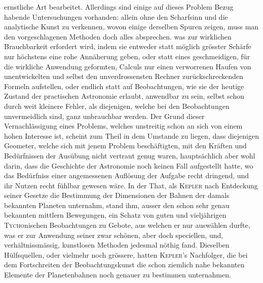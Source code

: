 \noindent ernstliche Art bearbeitet. Allerdings sind einige auf dieses Problem Bezug habende Untersuchungen vorhanden: allein ohne den Scharfsinn und die analytische Kunst zu verkennen, wovon einige derselben Spuren zeigen, muss man den vorgeschlagenen Methoden doch alles absprechen. was zur wirklichen Brauchbarkeit erfordert wird, indem sie entweder statt möglich grösster Schärfe nur höchstens eine rohe Annäherung geben, oder statt eines geschmeidigen, für die wirkliche Anwendung geformten, Calculs nur einen verworrenen Haufen von unentwickelten und selbst den unverdrossensten Rechner zurückschreckenden Formeln aufstellen, oder endlich statt auf Beobachtungen, wie sie der heutige Zustand der practischen Astronomie erlaubt, anwendbar zu sein, selbst schon durch weit kleinere Fehler, als diejenigen, welche bei den Beobachtungen unvermeidlich sind, ganz unbrauchbar werden. Der Grund dieser Vernachlässigung eines Problems, welches unstreitig schon an sich von einem hohen Interesse ist, scheint zum Theil in dem Umstande zu liegen, dass diejenigen Geometer, welche sich mit jenem Problem beschäftigten, mit den Kräften und Bedürfnissen der Ausübung nicht vertraut genug waren, hauptsächlich aber wohl darin, dass die Geschichte der Astronomie noch keinen Fall aufgestellt hatte, wo das Bedürfniss einer angemessenen Auflösung der Aufgabe recht dringend, und ihr Nutzen recht fühlbar gewesen wäre. In der That, als \textsc{Kepler} nach Entdeckung seiner Gesetze die Bestimmung der Dimensionen der Bahnen der damals bekannten Planeten unternahm, stand ihm, ausser den schon sehr genau bekannten mittlern Bewegungen, ein Schatz von guten und vieljährigen \textsc{Tycho}nischen Beobachtungen zu Gebote, aus welchen er nur auswählen durfte, was er zur Anwendung seiner zwar schönen, aber doch speciellen, und, verhältnissmässig, kunstlosen Methoden jedesmal nöthig fand. Dieselben Hülfsquellen, oder vielmehr noch grössere, hatten \textsc{Kepler}'s Nachfolger, die bei dem Fortschreiten der Beobachtungskunst die schon ziemlich nahe bekannten Elemente der Planetenbahnen noch genauer zu bestimmen unternahmen.

